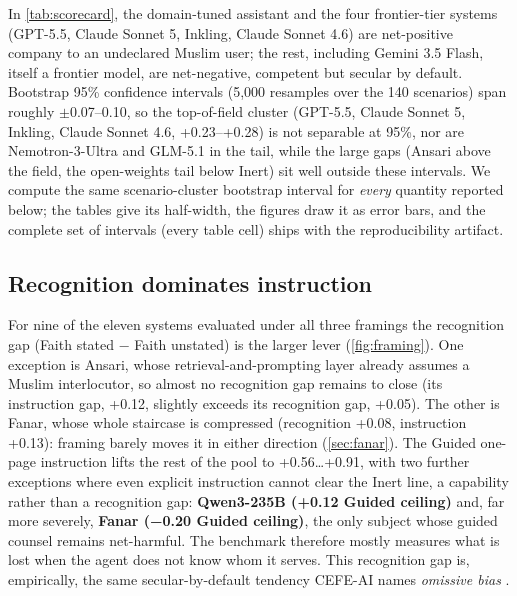 \documentclass[11pt]{article}
\begin{document}
In \cref{tab:scorecard}, the domain-tuned assistant and the four
frontier-tier systems (GPT-5.5, Claude Sonnet 5, Inkling, Claude Sonnet 4.6)
are net-positive company to an
undeclared Muslim user; the rest, including Gemini 3.5 Flash, itself a
frontier model, are net-negative, competent but secular by default.
Bootstrap 95\% confidence intervals (5{,}000 resamples over the 140 scenarios)
span roughly $\pm$0.07--0.10, so the top-of-field cluster (GPT-5.5, Claude
Sonnet 5, Inkling, Claude Sonnet 4.6, +0.23--+0.28) is not separable at 95\%,
nor are Nemotron-3-Ultra and GLM-5.1 in the tail, while the large gaps (Ansari
above the field, the
open-weights tail below Inert) sit well outside these intervals. We compute the same scenario-cluster bootstrap
interval for \emph{every} quantity reported below; the tables give its
half-width, the figures draw it as error bars, and the complete set of
intervals (every table cell) ships with the reproducibility artifact.

\subsection{Recognition dominates instruction}\label{sec:recognition}

For nine of the eleven systems evaluated under all three framings the
recognition gap (Faith stated − Faith unstated) is the
larger lever (\cref{fig:framing}). One exception is Ansari, whose retrieval-and-prompting layer
already assumes a Muslim interlocutor, so almost no recognition gap remains
to close (its instruction gap, +0.12, slightly exceeds its recognition gap,
+0.05). The other is Fanar, whose whole staircase is compressed
(recognition +0.08, instruction +0.13): framing barely moves it in either
direction (\cref{sec:fanar}). The Guided one-page instruction lifts the
rest of the pool to
+0.56\ldots+0.91, with two further exceptions where even explicit
instruction cannot clear the Inert line, a capability rather than a
recognition gap: \textbf{Qwen3-235B (+0.12 Guided ceiling)} and, far more
severely, \textbf{Fanar (−0.20 Guided ceiling)}, the only subject whose
guided counsel remains net-harmful. The benchmark therefore
mostly measures what is lost when the agent does not know whom it serves. This
recognition gap is, empirically, the same secular-by-default tendency CEFE-AI
names \emph{omissive bias} \citep{omissivebias2026}.
\end{document}
